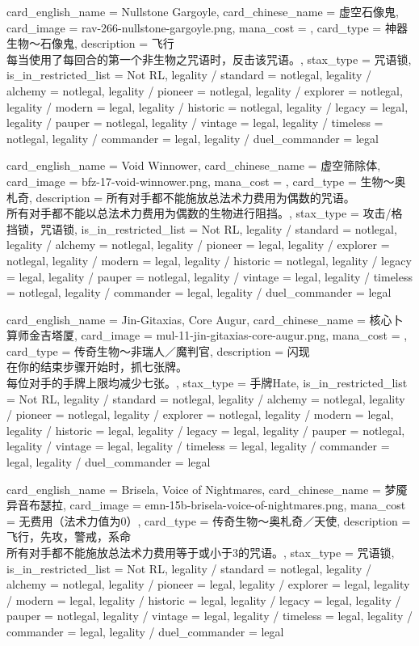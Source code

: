 \documentclass[lang = cn, color = black, 10pt]{AllThatStax}
\begin{document}
\card
{
	card_english_name = {Nullstone Gargoyle},
	card_chinese_name = {虚空石像鬼},
	card_image = rav-266-nullstone-gargoyle.png,
	mana_cost = ,
	card_type = 神器生物～石像鬼,
	description = {飞行\\
每当使用了每回合的第一个非生物之咒语时，反击该咒语。},
	stax_type = 咒语锁,
	is_in_restricted_list = Not RL,
	legality / standard = notlegal,
	legality / alchemy = notlegal,
	legality / pioneer = notlegal,
	legality / explorer = notlegal,
	legality / modern = legal,
	legality / historic = notlegal,
	legality / legacy = legal,
	legality / pauper = notlegal,
	legality / vintage = legal,
	legality / timeless = notlegal,
	legality / commander = legal,
	legality / duel_commander = legal
}

\card
{
	card_english_name = {Void Winnower},
	card_chinese_name = {虚空筛除体},
	card_image = bfz-17-void-winnower.png,
	mana_cost = ,
	card_type = 生物～奥札奇,
	description = {所有对手都不能施放总法术力费用为偶数的咒语。\\
所有对手都不能以总法术力费用为偶数的生物进行阻挡。},
	stax_type = 攻击/格挡锁，咒语锁,
	is_in_restricted_list = Not RL,
	legality / standard = notlegal,
	legality / alchemy = notlegal,
	legality / pioneer = legal,
	legality / explorer = notlegal,
	legality / modern = legal,
	legality / historic = notlegal,
	legality / legacy = legal,
	legality / pauper = notlegal,
	legality / vintage = legal,
	legality / timeless = notlegal,
	legality / commander = legal,
	legality / duel_commander = legal
}

\card
{
	card_english_name = {Jin-Gitaxias, Core Augur},
	card_chinese_name = {核心卜算师金吉塔厦},
	card_image = mul-11-jin-gitaxias-core-augur.png,
	mana_cost = ,
	card_type = 传奇生物～非瑞人／魔判官,
	description = {闪现\\
在你的结束步骤开始时，抓七张牌。\\
每位对手的手牌上限均减少七张。},
	stax_type = 手牌Hate,
	is_in_restricted_list = Not RL,
	legality / standard = notlegal,
	legality / alchemy = notlegal,
	legality / pioneer = notlegal,
	legality / explorer = notlegal,
	legality / modern = legal,
	legality / historic = legal,
	legality / legacy = legal,
	legality / pauper = notlegal,
	legality / vintage = legal,
	legality / timeless = legal,
	legality / commander = legal,
	legality / duel_commander = legal
}

\card
{
	card_english_name = {Brisela, Voice of Nightmares},
	card_chinese_name = {梦魇异音布瑟拉},
	card_image = emn-15b-brisela-voice-of-nightmares.png,
	mana_cost = 无费用（法术力值为0）,
	card_type = 传奇生物～奥札奇／天使,
	description = {飞行，先攻，警戒，系命\\
所有对手都不能施放总法术力费用等于或小于3的咒语。},
	stax_type = 咒语锁,
	is_in_restricted_list = Not RL,
	legality / standard = notlegal,
	legality / alchemy = notlegal,
	legality / pioneer = legal,
	legality / explorer = legal,
	legality / modern = legal,
	legality / historic = legal,
	legality / legacy = legal,
	legality / pauper = notlegal,
	legality / vintage = legal,
	legality / timeless = legal,
	legality / commander = legal,
	legality / duel_commander = legal
}
\end{document}
